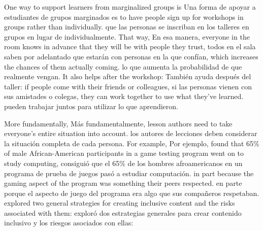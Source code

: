 One way to support learners from marginalized groups is
Una forma de apoyar a estudiantes de grupos marginados es
to have people sign up for workshops in groups rather than individually.
que las personas se inscriban en los talleres en grupos en lugar de individualmente.
That way,
En esa manera,
everyone in the room knows in advance that they will be with people they trust,
todos en el sala saben por adelantado que estarán con personas en la que confían,
which increases the chances of them actually coming.
lo que aumenta la probabilidad de que realmente vengan.
It also helps after the workshop:
También ayuda después del taller:
if people come with their friends or colleagues,
si las personas vienen con sus amistades o colegas,
they can work together to use what they've learned.
pueden trabajar juntos para utilizar lo que aprendieron.

More fundamentally,
Más fundamentalmente,
lesson authors need to take everyone's entire situation into account.
los autores de lecciones deben considerar la situación completa de cada persona.
For example,
Por ejemplo,
\cite{DiSa2014a} found that 65\% of male African-American participants in a game testing program went on to study computing,
\cite{DiSa2014a} consiguió que el 65\% de los hombres afroamericanos en un programa de prueba de juegos pasó a estudiar computación.
in part because the gaming aspect of the program was something their peers respected.
en parte porque el aspecto de juego del programa era algo que sus compañeros respetaban.
\cite{Lach2018} explored two general strategies for creating inclusive content
and the risks associated with them:
\cite{Lach2018} exploró dos estrategias generales para crear contenido inclusivo y los riesgos asociados con ellas:

